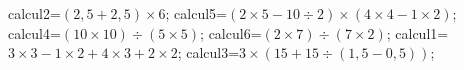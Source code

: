 \documentclass[exercice]{thedocument}%
\begin{document}
%
    \>calcul2=$(2,5+2,5)\times6$;%
    \>calcul5=$(2\times5-10\div2)\times(4\times4-1\times2)$;%
    \>calcul4=$(10\times10)\div(5\times5)$;%
    \>calcul6=$(2\times7)\div(7\times2)$;%
    \>calcul1=$3\times3-1\times2+4\times3+2\times2$;%
    \>calcul3=$3\times(15+15\div(1,5-0,5))$;%
\end{document}

